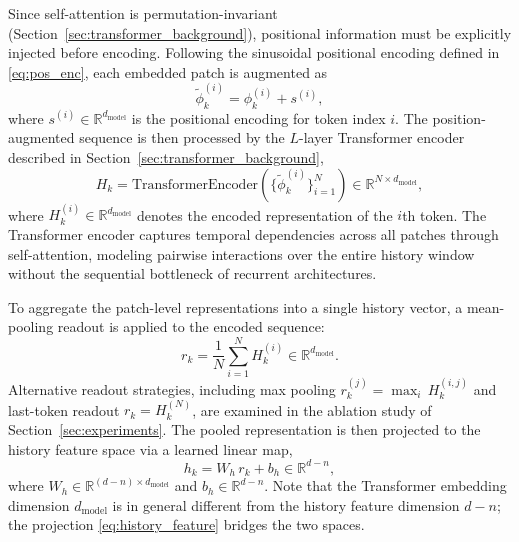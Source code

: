 \documentclass[journal]{IEEEtran}
\begin{document}
Since self-attention is permutation-invariant (Section~\ref{sec:transformer_background}), positional information must be explicitly injected before encoding. Following the sinusoidal positional encoding defined in \eqref{eq:pos_enc}, each embedded patch is augmented as
\begin{equation}
    \tilde{\phi}_k^{(i)} = \phi_k^{(i)} + s^{(i)},
    \label{eq:pos_enc_applied}
\end{equation}
where $s^{(i)} \in \mathbb{R}^{d_{\mathrm{model}}}$ is the positional encoding for token index $i$. The position-augmented sequence is then processed by the $L$-layer Transformer encoder described in Section~\ref{sec:transformer_background},
\begin{equation}
    H_k = \mathrm{TransformerEncoder}\!\left(
        \bigl\{\tilde{\phi}_k^{(i)}\bigr\}_{i=1}^N
    \right) \in \mathbb{R}^{N \times d_{\mathrm{model}}},
    \label{eq:transformer_enc}
\end{equation}
where $H_k^{(i)} \in \mathbb{R}^{d_{\mathrm{model}}}$ denotes the encoded representation of the $i$th token. The Transformer encoder captures temporal dependencies across all patches through self-attention, modeling pairwise interactions over the entire history window without the sequential bottleneck of recurrent architectures.

To aggregate the patch-level representations into a single history vector, a mean-pooling readout is applied to the encoded sequence:
\begin{equation}
    r_k = \frac{1}{N}\sum_{i=1}^{N} H_k^{(i)} \in \mathbb{R}^{d_{\mathrm{model}}}.
    \label{eq:pooling}
\end{equation}
Alternative readout strategies, including max pooling $r_k^{(j)} = \max_i\, H_k^{(i,j)}$ and last-token readout $r_k = H_k^{(N)}$, are examined in the ablation study of Section~\ref{sec:experiments}. The pooled representation is then projected to the history feature space via a learned linear map,
\begin{equation}
    h_k = W_h\, r_k + b_h \in \mathbb{R}^{d-n},
    \label{eq:history_feature}
\end{equation}
where $W_h \in \mathbb{R}^{(d-n) \times d_{\mathrm{model}}}$ and $b_h \in \mathbb{R}^{d-n}$. Note that the Transformer embedding dimension $d_{\mathrm{model}}$ is in general different from the history feature dimension $d - n$; the projection \eqref{eq:history_feature} bridges the two spaces.
\end{document}
